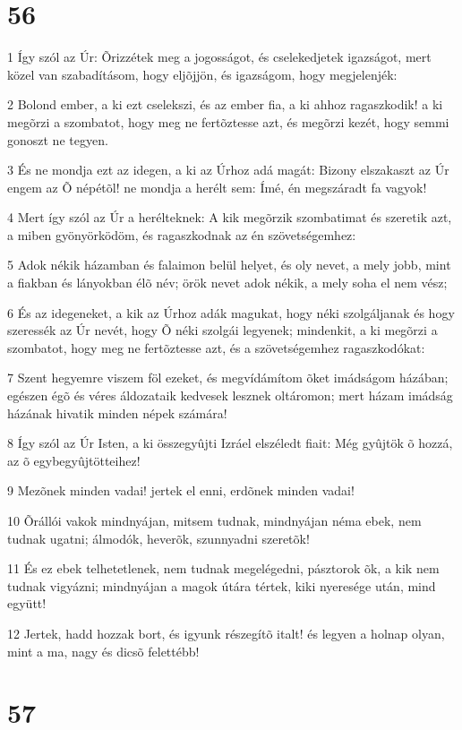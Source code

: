 \chapter{56}

\par 1 Így szól az Úr: Õrizzétek meg a jogosságot, és cselekedjetek igazságot, mert közel van szabadításom, hogy eljõjjön, és igazságom, hogy megjelenjék:
\par 2 Bolond ember, a ki ezt cselekszi, és az ember fia, a ki ahhoz ragaszkodik! a ki megõrzi a szombatot, hogy meg ne fertõztesse azt, és megõrzi kezét, hogy semmi gonoszt ne tegyen.
\par 3 És ne mondja ezt az idegen, a ki az Úrhoz adá magát: Bizony elszakaszt az Úr engem az Õ népétõl! ne mondja a herélt sem: Ímé, én megszáradt fa vagyok!
\par 4 Mert így szól az Úr a herélteknek: A kik megõrzik szombatimat és szeretik azt, a miben gyönyörködöm, és ragaszkodnak az én szövetségemhez:
\par 5 Adok nékik házamban és falaimon belül helyet, és oly nevet, a mely jobb, mint a fiakban és lányokban élõ név; örök nevet adok nékik, a mely soha el nem vész;
\par 6 És az idegeneket, a kik az Úrhoz adák magukat, hogy néki szolgáljanak és hogy szeressék az Úr nevét, hogy Õ néki szolgái legyenek; mindenkit, a ki megõrzi a szombatot, hogy meg ne fertõztesse azt, és a szövetségemhez ragaszkodókat:
\par 7 Szent hegyemre viszem föl ezeket, és megvídámítom õket imádságom házában; egészen égõ és véres áldozataik kedvesek lesznek oltáromon; mert házam imádság házának  hivatik minden népek számára!
\par 8 Így szól az Úr Isten, a ki összegyûjti Izráel elszéledt fiait: Még gyûjtök õ hozzá, az õ egybegyûjtötteihez!
\par 9 Mezõnek minden vadai! jertek el enni, erdõnek minden vadai!
\par 10 Õrállói vakok mindnyájan, mitsem tudnak, mindnyájan néma ebek, nem tudnak ugatni; álmodók, heverõk, szunnyadni szeretõk!
\par 11 És ez ebek telhetetlenek, nem tudnak megelégedni, pásztorok õk, a kik nem tudnak vigyázni; mindnyájan a magok útára tértek, kiki nyeresége után, mind együtt!
\par 12 Jertek, hadd hozzak bort, és igyunk részegítõ italt! és legyen a holnap olyan, mint a ma, nagy és dicsõ felettébb!

\chapter{57}

